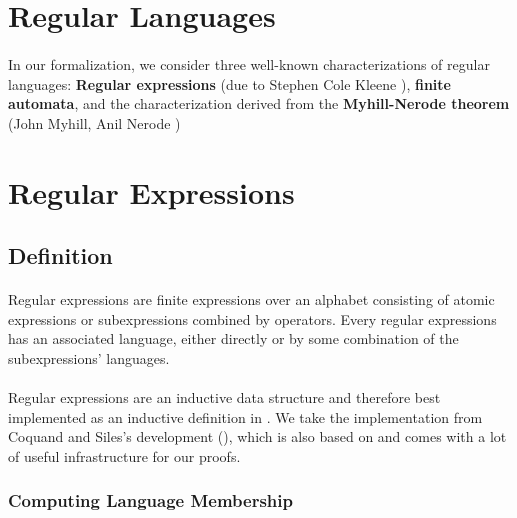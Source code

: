 \documentclass[11pt,a4paper,oneside]{book}
\begin{document}
        \section{Regular Languages}
        
        \paragraph{} In our formalization, we consider three well-known characterizations of regular languages: \textbf{Regular expressions} (due to Stephen Cole Kleene \cite{KleeneNets}), \textbf{finite automata}, and the characterization derived from the \textbf{Myhill-Nerode theorem} (John Myhill, Anil Nerode \cite{Nerode1958}) 
    
        \section{Regular Expressions}

            \subsection{Definition}

                \paragraph{} Regular expressions are finite expressions over an alphabet consisting of atomic expressions or subexpressions combined by operators. Every regular expressions has an associated language, either directly or by some combination of the subexpressions' languages.

                \paragraph{} Regular expressions are an inductive data structure and therefore best implemented as an inductive definition in \coq. We take the implementation from Coquand and Siles's development (\cite{DBLP:conf/cpp/CoquandS11}), which is also based on \ssreflect and comes with a lot of useful infrastructure for our proofs.

                \subsubsection{Computing Language Membership}

                    \paragraph{}
\end{document}
